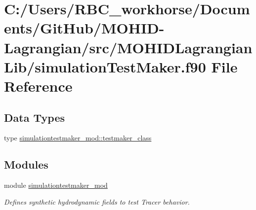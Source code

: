 \hypertarget{simulation_test_maker_8f90}{}\section{C\+:/\+Users/\+R\+B\+C\+\_\+workhorse/\+Documents/\+Git\+Hub/\+M\+O\+H\+I\+D-\/\+Lagrangian/src/\+M\+O\+H\+I\+D\+Lagrangian\+Lib/simulation\+Test\+Maker.f90 File Reference}
\label{simulation_test_maker_8f90}
\subsection*{Data Types}
\begin{DoxyCompactItemize}
\item 
type \mbox{\hyperlink{structsimulationtestmaker__mod_1_1testmaker__class}{simulationtestmaker\+\_\+mod\+::testmaker\+\_\+class}}
\end{DoxyCompactItemize}
\subsection*{Modules}
\begin{DoxyCompactItemize}
\item 
module \mbox{\hyperlink{namespacesimulationtestmaker__mod}{simulationtestmaker\+\_\+mod}}
\begin{DoxyCompactList}\small\item\em Defines synthetic hydrodynamic fields to test Tracer behavior. \end{DoxyCompactList}\end{DoxyCompactItemize}
